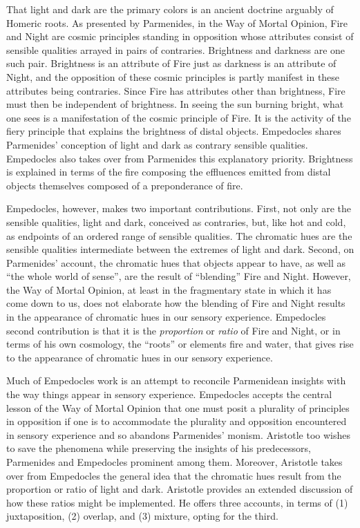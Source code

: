 That light and dark are the primary colors is an ancient doctrine arguably of Homeric roots. As presented by Parmenides, in the Way of Mortal Opinion, Fire and Night are cosmic principles standing in opposition whose attributes consist of sensible qualities arrayed in pairs of contraries. Brightness and darkness are one such pair. Brightness is an attribute of Fire just as darkness is an attribute of Night, and the opposition of these cosmic principles is partly manifest in these attributes being contraries. Since Fire has attributes other than brightness, Fire must then be independent of brightness. In seeing the sun burning bright, what one sees is a manifestation of the cosmic principle of Fire. It is the activity of the fiery principle that explains the brightness of distal objects. Empedocles shares Parmenides' conception of light and dark as contrary sensible qualities. Empedocles also takes over from Parmenides this explanatory priority. Brightness is explained in terms of the fire composing the effluences emitted from distal objects themselves composed of a preponderance of fire.

Empedocles, however, makes two important contributions. First, not only are the sensible qualities, light and dark, conceived as contraries, but, like hot and cold, as endpoints of an ordered range of sensible qualities. The chromatic hues are the sensible qualities intermediate between the extremes of light and dark. Second, on Parmenides' account, the chromatic hues that objects appear to have, as well as ``the whole world of sense'', are the result of ``blending'' Fire and Night. However, the Way of Mortal Opinion, at least in the fragmentary state in which it has come down to us, does not elaborate how the blending of Fire and Night results in the appearance of chromatic hues in our sensory experience. Empedocles second contribution is that it is the \emph{proportion} or \emph{ratio} of Fire and Night, or in terms of his own cosmology, the ``roots'' or elements fire and water, that gives rise to the appearance of chromatic hues in our sensory experience. 

Much of Empedocles work is an attempt to reconcile Parmenidean insights with the way things appear in sensory experience. Empedocles accepts the central lesson of the Way of Mortal Opinion that one must posit a plurality of principles in opposition if one is to accommodate the plurality and opposition encountered in sensory experience and so abandons Parmenides' monism. Aristotle too wishes to save the phenomena while preserving the insights of his predecessors, Parmenides and Empedocles prominent among them. Moreover, Aristotle takes over from Empedocles the general idea that the chromatic hues result from the proportion or ratio of light and dark. Aristotle provides an extended discussion of how these ratios might be implemented. He offers three accounts, in terms of (1) juxtaposition, (2) overlap, and (3) mixture, opting for the third. \change

